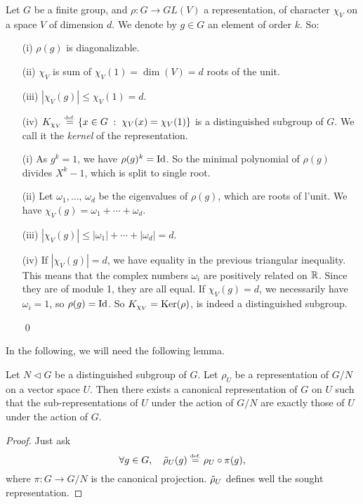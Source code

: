 \begin{prop}
\label{kernel-prop-characters}
Let $ G $ be a finite group, and $ \rho: G \rightarrow GL (V) $ a representation, of character $ \chi_V $ on a space $ V $ of dimension $ d $. We denote by $ g \in G $ an element of order $ k $. So: \begin{itemize}
\item [{\upshape (i)}]  $ \rho (g) $ is diagonalizable.
\item [{\upshape (ii)}] $ \chi_V $ is sum of $ \chi_V (1) = \dim (V) = d $ roots  of the unit.
\item [{\upshape (iii)}] $ | \chi_V (g) | \leq \chi_V (1) = d $.
\item [{\upshape (iv)}]  $ K_{\chi_V} \stackrel{\mbox{\upshape\tiny def.}}{=} \left\{ x \in G \;:\; \chi_V (x) = \chi_V (1) \right\} $ is a distinguished subgroup of $ G $. We call it the \textit{kernel} of the representation.
\end{itemize}
\end{prop}
\begin{proofnoqed}
\begin{itemize}
\item [{\upshape (i)}] As $ g^k = 1 $, we have $ \rho (g)^k = \operatorname{Id} $. So the minimal polynomial of $ \rho (g) $ divides $ X^k - 1 $, which is split to single root.
\item [{\upshape (ii)}] Let $ \omega_1, \ldots, \, \omega_d $ be the eigenvalues of $ \rho (g) $, which are  roots of l'unit. We have $ \chi_V (g) = \omega_1 + \cdots + \omega_d $.
\item [{\upshape (iii)}] $ | \chi_V (g) | \leq | \omega_1 | + \cdots + | \omega_d | = d $.
\item [{\upshape (iv)}] If $ | \chi_V (g) | = d $, we have equality in the previous triangular inequality. This means that the complex numbers $ \omega_i $ are positively related on $ \mathbb{R} $. Since they are of module 1, they are all equal. If $ \chi_V (g) = d $, we necessarily have $ \omega_i = 1 $, so $ \rho (g) = \operatorname{Id} $. So $ K_{\chi_V} = \operatorname{Ker} (\rho) $, is indeed a distinguished subgroup.{\raggedright \qed}
\end{itemize}
\end{proofnoqed}
In the following, we will need the following lemma.
 
\begin{lem}
\label{lem-extension-repr-grpe-distignue}
Let $ N \lhd G $ be a distinguished subgroup of $ G $. Let $ \rho_U $ be a representation of $ G / N $ on a vector space $ U $. Then there exists a canonical representation of $ G $ on $ U $ such that the sub-representations of $ U $ under the action of $ G / N $ are exactly those of $ U $ under the action of $ G $.
\end{lem}
\begin{proof}
Just ask
\begin{equation*}
\forall g \in G, \quad \tilde{\rho}_U (g) \stackrel{\mbox{\upshape\tiny def.}}{=} \rho_U \circ \pi (g),
\end{equation*}
where $ \pi: G \rightarrow G / N $ is the canonical projection. $ \tilde{\rho}_U $ defines well the sought representation.
\end{proof}
 
